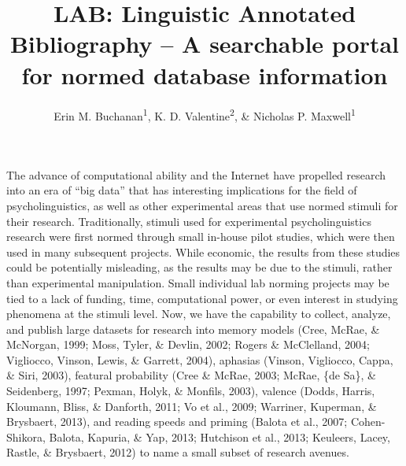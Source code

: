 \documentclass[english,,man]{apa6}
\title{LAB: Linguistic Annotated Bibliography -- A searchable portal for normed
database information}
\author{Erin M. Buchanan\textsuperscript{1}, K. D. Valentine\textsuperscript{2},
\& Nicholas P. Maxwell\textsuperscript{1}}
\date{}
\affiliation{
\vspace{0.5cm}
\textsuperscript{1} Missouri State University\\\textsuperscript{2} University of Missouri}
\theoremstyle{definition}
\theoremstyle{definition}
\theoremstyle{definition}
\theoremstyle{remark}
\begin{document}
\maketitle

The advance of computational ability and the Internet have propelled
research into an era of \enquote{big data} that has interesting
implications for the field of psycholinguistics, as well as other
experimental areas that use normed stimuli for their research.
Traditionally, stimuli used for experimental psycholinguistics research
were first normed through small in-house pilot studies, which were then
used in many subsequent projects. While economic, the results from these
studies could be potentially misleading, as the results may be due to
the stimuli, rather than experimental manipulation. Small individual lab
norming projects may be tied to a lack of funding, time, computational
power, or even interest in studying phenomena at the stimuli level. Now,
we have the capability to collect, analyze, and publish large datasets
for research into memory models (Cree, McRae, \& McNorgan, 1999; Moss,
Tyler, \& Devlin, 2002; Rogers \& McClelland, 2004; Vigliocco, Vinson,
Lewis, \& Garrett, 2004), aphasias (Vinson, Vigliocco, Cappa, \& Siri,
2003), featural probability (Cree \& McRae, 2003; McRae, \{de Sa\}, \&
Seidenberg, 1997; Pexman, Holyk, \& Monfils, 2003), valence (Dodds,
Harris, Kloumann, Bliss, \& Danforth, 2011; Vo et al., 2009; Warriner,
Kuperman, \& Brysbaert, 2013), and reading speeds and priming (Balota et
al., 2007; Cohen-Shikora, Balota, Kapuria, \& Yap, 2013; Hutchison et
al., 2013; Keuleers, Lacey, Rastle, \& Brysbaert, 2012) to name a small
subset of research avenues.
\end{document}
